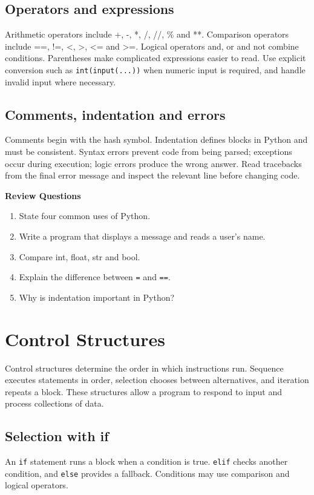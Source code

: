 \documentclass[11pt,openany,oneside]{book}
\newcommand{\reviewtitle}{\par\noindent\textbf{\color{Navy}Review Questions}\par}
\begin{document}
\section{Operators and expressions}
Arithmetic operators include +, -, *, /, //, \% and **. Comparison operators include ==, !=, <, >, <= and >=. Logical operators and, or and not combine conditions. Parentheses make complicated expressions easier to read. Use explicit conversion such as \texttt{int(input(...))} when numeric input is required, and handle invalid input where necessary.

\section{Comments, indentation and errors}
Comments begin with the hash symbol. Indentation defines blocks in Python and must be consistent. Syntax errors prevent code from being parsed; exceptions occur during execution; logic errors produce the wrong answer. Read tracebacks from the final error message and inspect the relevant line before changing code.

\reviewtitle
\begin{enumerate}
\item State four common uses of Python.
\item Write a program that displays a message and reads a user's name.
\item Compare int, float, str and bool.
\item Explain the difference between \texttt{=} and \texttt{==}.
\item Why is indentation important in Python?
\end{enumerate}

\chapter{Control Structures}
Control structures determine the order in which instructions run. Sequence executes statements in order, selection chooses between alternatives, and iteration repeats a block. These structures allow a program to respond to input and process collections of data.

\section{Selection with if}
An \texttt{if} statement runs a block when a condition is true. \texttt{elif} checks another condition, and \texttt{else} provides a fallback. Conditions may use comparison and logical operators.
\end{document}
